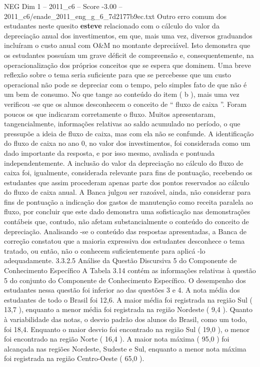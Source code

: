 \begin{textsample}{NEG Dim 1 – 2011\_c6 – Score -3.00 – 2011\_c6/enade\_2011\_eng\_g\_6\_7d2177b9ec.txt}
Outro erro comum dos estudantes neste quesito \textbf{esteve} relacionado com o cálculo do valor da depreciação anual dos investimentos, em que, mais uma vez, diversos graduandos incluíram o custo anual com O\&M no montante depreciável.
Isto demonstra que os estudantes possuíam um grave déficit de compreensão e, consequentemente, na operacionalização dos próprios conceitos que se espera que dominem.
Uma breve reflexão sobre o tema seria suficiente para que se percebesse que um custo operacional não pode se depreciar com o tempo, pelo simples fato de que não é um bem de consumo.
No que tange ao conteúdo do item ( b ), mais uma vez verificou -se que os alunos desconhecem o conceito de “ fluxo de caixa ”.
Foram poucos os que indicaram corretamente o fluxo.
Muitos apresentaram, tangencialmente, informações relativas ao saldo acumulado no período, o que pressupõe a ideia de fluxo de caixa, mas com ela não se confunde.
A identificação do fluxo de caixa no ano 0, no valor dos investimentos, foi considerada como um dado importante da resposta, e por isso mesmo, avaliada e pontuada independentemente.
A inclusão do valor da depreciação no cálculo do fluxo de caixa foi, igualmente, considerada relevante para fins de pontuação, recebendo os estudantes que assim procederam apenas parte dos pontos reservados ao cálculo do fluxo de caixa anual.
A Banca julgou ser razoável, ainda, não considerar para fins de pontuação a indicação dos gastos de manutenção como receita paralela ao fluxo, por concluir que este dado demonstra uma sofisticação nas demonstrações contábeis que, contudo, não afetam substancialmente o conteúdo do conceito de depreciação.
Analisando -se o conteúdo das respostas apresentadas, a Banca de correção constatou que a maioria expressiva dos estudantes desconhece o tema tratado, ou então, não o conhecem suficientemente para aplicá -lo adequadamente. 3.3.2.5 Análise da Questão Discursiva 5 do Componente de Conhecimento Específico A Tabela 3.14 contém as informações relativas à questão 5 do conjunto do Componente de Conhecimento Específico.
O desempenho dos estudantes nessa questão foi inferior ao das questões 3 e 4.
A nota média dos estudantes de todo o Brasil foi 12,6.
A maior média foi registrada na região Sul ( 13,7 ), enquanto a menor média foi registrada na região Nordeste ( 9,4 ).
Quanto à variabilidade das notas, o desvio padrão dos alunos do Brasil, como um todo, foi 18,4.
Enquanto o maior desvio foi encontrado na região Sul ( 19,0 ), o menor foi encontrado na região Norte ( 16,4 ).
A maior nota máxima ( 95,0 ) foi alcançada nas regiões Nordeste, Sudeste e Sul, enquanto a menor nota máxima foi registrada na região Centro-Oeste ( 65,0 ).

\end{textsample}
